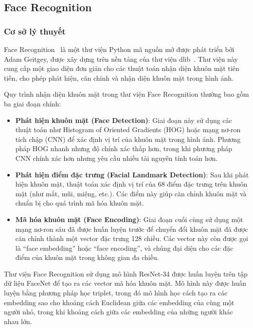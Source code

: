 \subsection{Face Recognition}

\subsubsection{Cơ sở lý thuyết}

Face Recognition~\cite{facerecognition} là một thư viện Python mã nguồn mở được phát triển bởi Adam Geitgey, được xây dựng trên nền tảng của thư viện dlib~\cite{dlib}. Thư viện này cung cấp một giao diện đơn giản cho các thuật toán nhận diện khuôn mặt tiên tiến, cho phép phát hiện, căn chỉnh và nhận diện khuôn mặt trong hình ảnh.

Quy trình nhận diện khuôn mặt trong thư viện Face Recognition thường bao gồm ba giai đoạn chính:

\begin{itemize}
    \item \textbf{Phát hiện khuôn mặt (Face Detection)}: Giai đoạn này sử dụng các thuật toán như Histogram of Oriented Gradients (HOG) hoặc mạng nơ-ron tích chập (CNN) để xác định vị trí của khuôn mặt trong hình ảnh. Phương pháp HOG nhanh nhưng độ chính xác thấp hơn, trong khi phương pháp CNN chính xác hơn nhưng yêu cầu nhiều tài nguyên tính toán hơn.
    
    \item \textbf{Phát hiện điểm đặc trưng (Facial Landmark Detection)}: Sau khi phát hiện khuôn mặt, thuật toán xác định vị trí của 68 điểm đặc trưng trên khuôn mặt (như mắt, mũi, miệng, etc.). Các điểm này giúp căn chỉnh khuôn mặt và chuẩn bị cho quá trình mã hóa khuôn mặt.
    
    \item \textbf{Mã hóa khuôn mặt (Face Encoding)}: Giai đoạn cuối cùng sử dụng một mạng nơ-ron sâu đã được huấn luyện trước để chuyển đổi khuôn mặt đã được căn chỉnh thành một vector đặc trưng 128 chiều. Các vector này còn được gọi là ``face embedding'' hoặc ``face encoding'', và chúng đại diện cho các đặc điểm của khuôn mặt trong không gian đa chiều.
\end{itemize}

Thư viện Face Recognition sử dụng mô hình ResNet-34 được huấn luyện trên tập dữ liệu FaceNet để tạo ra các vector mã hóa khuôn mặt. Mô hình này được huấn luyện bằng phương pháp học triplet, trong đó mô hình học cách tạo ra các embedding sao cho khoảng cách Euclidean giữa các embedding của cùng một người nhỏ, trong khi khoảng cách giữa các embedding của những người khác nhau lớn.


